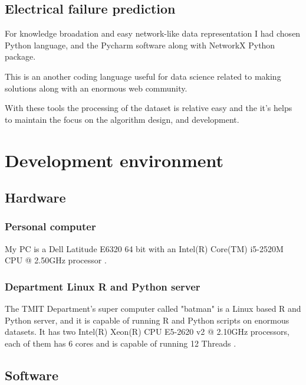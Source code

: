 		\subsection{Electrical failure prediction}
For knowledge broadation and easy network-like data representation I had chosen Python language, and the Pycharm software \cite{PyCharm} along with NetworkX Python package\cite{NetworkX}.

This is an another coding language useful for data science related to making solutions along with an enormous web community. 

With these tools the processing of the dataset is relative easy and the it's helps to maintain the focus on the algorithm design, and development.
	\section{Development environment}
		\subsection{Hardware}
			\subsubsection{Personal computer}
My PC is a Dell Latitude E6320 64 bit with an Intel(R) Core(TM) i5-2520M CPU @ 2.50GHz processor \cite{Latitude}.
			\subsubsection{Department Linux R and Python server}
The TMIT Department's super computer called "batman" is a Linux based R and Python server, and it is capable of running R and Python scripts on enormous datasets. It has two Intel(R) Xeon(R) CPU E5-2620 v2 @ 2.10GHz processors, each of them has 6 cores and is capable of running 12 Threads \cite{Batman}.
		\subsection{Software}
